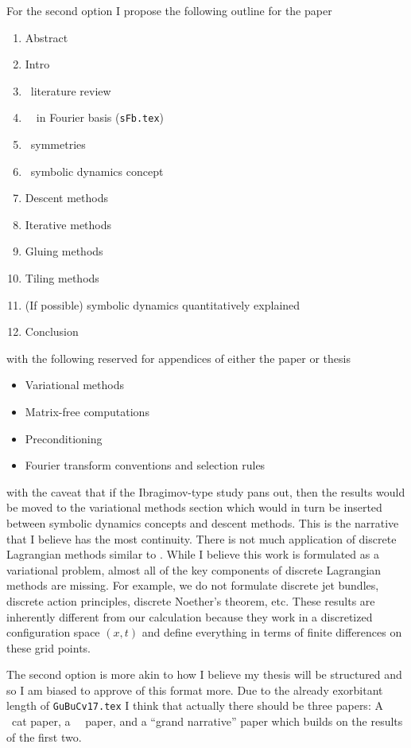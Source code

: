 \begin{description}
{For the second option I propose the following outline for the paper
\begin{enumerate}
\item Abstract
\item Intro
\item \KSe\ literature review
\item \Spt\ \KSe\ in Fourier basis (\texttt{sFb.tex})
\item \Spt\ symmetries
\item \Spt\ symbolic dynamics concept
\item Descent methods
\item Iterative methods
\item Gluing methods
\item Tiling methods
\item (If possible) symbolic dynamics quantitatively explained
\item Conclusion
\end{enumerate}
with the following reserved for appendices of either the paper or
thesis
\begin{itemize}
\item Variational methods
\item Matrix-free computations
\item Preconditioning
\item Fourier transform conventions and selection rules
\end{itemize}
with the caveat that if the Ibragimov-type study pans out, then
the results would be moved to the variational methods section which
would in turn be inserted between symbolic dynamics concepts and
descent methods. This is the narrative that I believe has the most
continuity. There is not much application of discrete Lagrangian methods
similar to . While I believe this work is formulated
as a variational problem, almost all of the key components of discrete Lagrangian
methods are missing. For example, we do not formulate discrete jet bundles, discrete
action principles, discrete Noether's theorem, etc. These results are inherently
different from our calculation because they work in a discretized configuration
space $(x,t)$ and define everything in terms of finite differences on these
grid points.

The second option is more akin to how I believe my thesis will be structured
and so I am biased to approve of this format more. Due to the already
exorbitant length of \texttt{GuBuCv17.tex} I think that actually there
should be three papers: A \spt\ cat paper, a \spt\ \KS\ paper, and a
``grand narrative'' paper which builds on the results of the first two.

}
\end{description}
